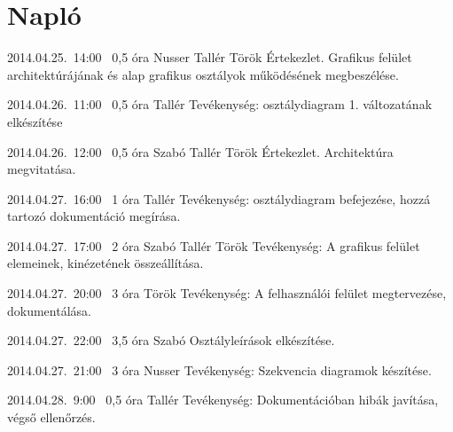 %
\pagebreak
\section{Napló}
\begin{naplo}

\bejegyzes
{2014.04.25.~14:00~}
{0,5 óra}
{Nusser\newline
Tallér\newline
Török}
{Értekezlet. Grafikus felület architektúrájának és alap grafikus osztályok működésének megbeszélése.}

\bejegyzes
{2014.04.26.~11:00~}
{0,5 óra}
{Tallér}
{Tevékenység: osztálydiagram 1. változatának elkészítése}

\bejegyzes
{2014.04.26.~12:00~}
{0,5 óra}
{Szabó\newline
Tallér\newline
Török}
{Értekezlet. Architektúra megvitatása.}

\bejegyzes
{2014.04.27.~16:00~}
{1 óra}
{Tallér}
{Tevékenység: osztálydiagram befejezése, hozzá tartozó dokumentáció megírása.}

\bejegyzes
{2014.04.27.~17:00~}
{2 óra}
{Szabó\newline
Tallér\newline
Török}
{Tevékenység: A grafikus felület elemeinek, kinézetének összeállítása.}

\bejegyzes
{2014.04.27.~20:00~}
{3 óra}
{Török}
{Tevékenység: A felhasználói felület megtervezése, dokumentálása.}

\bejegyzes
{2014.04.27.~22:00~} %
{3,5 óra} %
{Szabó} %
{Osztályleírások elkészítése.} %

\bejegyzes
{2014.04.27.~21:00~}
{3 óra}
{Nusser}
{Tevékenység: Szekvencia diagramok készítése.}

\bejegyzes
{2014.04.28.~9:00~}
{0,5 óra}
{Tallér}
{Tevékenység: Dokumentációban hibák javítása, végső ellenőrzés.}

\end{naplo}
